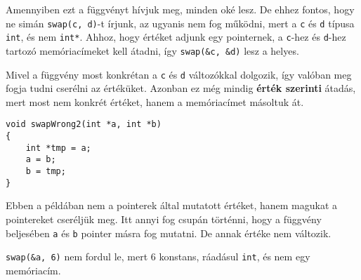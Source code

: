 \documentclass[a4paper,11.5pt]{article}
\begin{document}
		Amennyiben ezt a függvényt hívjuk meg, minden oké lesz. De ehhez fontos, hogy ne simán \texttt{swap(c, d)}-t írjunk, az ugyanis nem fog működni, mert a \texttt{c} és \texttt{d} típusa \texttt{int}, és nem \texttt{int*}. Ahhoz, hogy értéket adjunk egy pointernek, a \texttt{c}-hez és \texttt{d}-hez tartozó memóriacímeket kell átadni, így \texttt{swap(\&c, \&d)} lesz a helyes.
		\bigskip
		
		Mivel a függvény most konkrétan a \texttt{c} és \texttt{d} változókkal dolgozik, így valóban meg fogja tudni cserélni az értéküket. Azonban ez még mindig \textbf{érték szerinti} átadás, mert most nem konkrét értéket, hanem a memóriacímet másoltuk át.
		
		\begin{lstlisting}
void swapWrong2(int *a, int *b)
{
	int *tmp = a;
	a = b;
	b = tmp;
}
		\end{lstlisting}
		Ebben a példában nem a pointerek által mutatott értéket, hanem magukat a pointereket cseréljük meg. Itt annyi fog csupán történni, hogy a függvény beljesében \texttt{a} és \texttt{b} pointer másra fog mutatni. De annak értéke nem változik.
		
		\medskip
		\texttt{swap(\&a, 6)} nem fordul le, mert 6 konstans, ráadásul \texttt{int}, és nem egy memóriacím.
\end{document}
